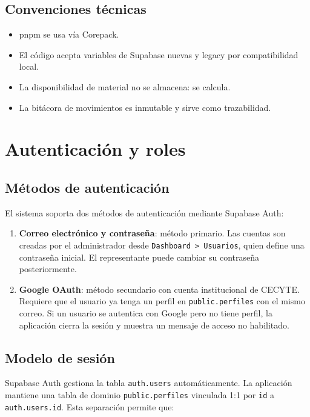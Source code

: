 \documentclass[12pt,a4paper,oneside]{report}
\newcommand{\file}[1]{\texttt{\color{cecyteDark}#1}}
\begin{document}
\section{Convenciones técnicas}

\begin{itemize}
  \item pnpm se usa vía Corepack.
  \item El código acepta variables de Supabase nuevas y legacy por compatibilidad local.
  \item La disponibilidad de material no se almacena: se calcula.
  \item La bitácora de movimientos es inmutable y sirve como trazabilidad.
\end{itemize}

\chapter{Autenticación y roles}

\section{Métodos de autenticación}

El sistema soporta dos métodos de autenticación mediante Supabase Auth:

\begin{enumerate}
  \item \textbf{Correo electrónico y contraseña}: método primario. Las cuentas son creadas por el administrador desde \file{Dashboard > Usuarios}, quien define una contraseña inicial. El representante puede cambiar su contraseña posteriormente.
  \item \textbf{Google OAuth}: método secundario con cuenta institucional de CECYTE. Requiere que el usuario ya tenga un perfil en \file{public.perfiles} con el mismo correo. Si un usuario se autentica con Google pero no tiene perfil, la aplicación cierra la sesión y muestra un mensaje de acceso no habilitado.
\end{enumerate}

\section{Modelo de sesión}

Supabase Auth gestiona la tabla \file{auth.users} automáticamente. La aplicación mantiene una tabla de dominio \file{public.perfiles} vinculada 1:1 por \file{id} a \file{auth.users.id}. Esta separación permite que:
\end{document}
